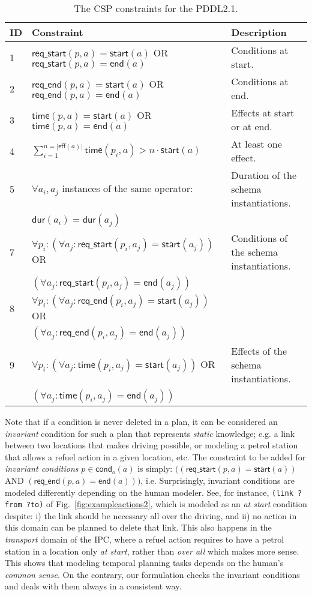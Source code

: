\documentclass{ecai}
\newcommand{\eff}{\mathsf{eff}}    %
\newcommand{\cond}{\mathsf{cond}}  %
\newcommand{\dur}{\mathsf{dur}}    %
\newcommand{\start}{\mathsf{start}}%
\newcommand{\en}{\mathsf{end}}     %
\newcommand{\tim}{\mathsf{time}}   %
\newcommand{\reqs}{\mathsf{req\_{start}}} %
\newcommand{\reqe}{\mathsf{req\_{end}}}   %
\begin{document}
\begin{table}
\setlength\extrarowheight{2pt}    
\begin{tiny}
\begin{tabular}{lll}
{\bf ID} & {\bf Constraint} & {\bf Description} \\\hline
1&$\reqs(p,a) = \start(a)$ OR $\reqs(p,a) = \en(a)$ & Conditions at start.\\
2&$\reqe(p,a) = \start(a)$ OR $\reqe(p,a) = \en(a)$ & Conditions at end.\\
3&$\tim(p,a) = \start(a)$ OR $\tim(p,a) = \en(a)$ & Effects at start or at end.\\
4&$\sum_{i=1}^{n =|\eff(a)|} \tim(p_i,a) > n \cdot \start(a)$ & At least one effect.\\
5&$\forall a_i,a_j$ instances of the same operator: & Duration of the schema instantiations.\\
&$\dur(a_i) = \dur(a_j)$ &\\

7&$\forall p_i: (\forall a_j: \reqs(p_i,a_j) = \start(a_j))$ OR & Conditions of the schema instantiations.\\
&$(\forall a_j: \reqs(p_i,a_j) = \en(a_j))$ & \\

8&$\forall p_i: (\forall a_j: \reqe(p_i,a_j) = \start(a_j))$ OR  & \\
&$(\forall a_j: \reqe(p_i,a_j) = \en(a_j))$ & \\

9&$\forall p_i: (\forall a_j: \tim(p_i,a_j) = \start(a_j))$ OR  & Effects of the schema instantiations.\\
&$(\forall a_j: \tim(p_i,a_j) = \en(a_j))$ &
\end{tabular}
\end{tiny}
\caption{\small The CSP constraints for the PDDL2.1.}
\label{table:21constraints}
\end{table}

Note that if a condition is never deleted in a plan, it can be considered an {\em invariant} condition for such a plan that represents {\em static} knowledge; e.g. a link between two locations that makes driving possible, or modeling a petrol station that allows a refuel action in a given location, etc. The constraint to be added for {\em invariant conditions} $p \in \cond_o(a)$ is simply: $((\reqs(p,a) = \start(a))$ AND $(\reqe(p,a) = \en(a)))$, i.e. Surprisingly, invariant conditions are modeled differently depending on the human modeler. See, for instance, \texttt{(link ?from ?to)} of Fig.~\ref{fig:exampleactions2}, which is modeled as an \emph{at start} condition despite: i) the link should be necessary all over the driving, and ii) no action in this domain can be planned to delete that link.
This also happens in the \emph{transport} domain of the IPC, where a refuel action requires to have a petrol station in a location only \emph{at start}, rather than \emph{over all} which makes more sense. This shows that modeling temporal planning tasks depends on the human's {\em common sense}. On the contrary, our formulation checks the invariant conditions and deals with them always in a consistent way.
\end{document}

